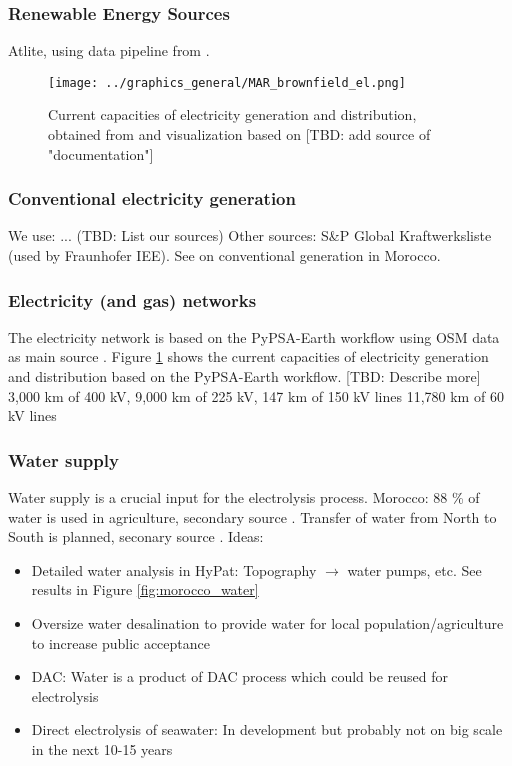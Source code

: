 \subsubsection{Renewable Energy Sources}
Atlite, using data pipeline from \cite{Parzen2022}.





\begin{figure}[h!]
    \centering
    \texttt{[image: ../graphics\_general/MAR\_brownfield\_el.png]}
    \caption{Current capacities of electricity generation and distribution, obtained from \cite{Parzen2022} and visualization based on [TBD: add source of "documentation"]}
    \label{fig:MAR_brownfield}
\end{figure}


\subsubsection{Conventional electricity generation}
We use: ... (TBD: List our sources)
Other sources: S\&P Global Kraftwerksliste (used by Fraunhofer IEE).
See \cite[p. 26]{Ersoy2022}  on conventional generation in Morocco.



\subsubsection{Electricity (and gas) networks}
The electricity network is based on the PyPSA-Earth workflow using OSM data as main source \cite{Parzen2022}. Figure \ref{fig:MAR_brownfield} shows the current capacities of electricity generation and distribution based on the PyPSA-Earth workflow. [TBD: Describe more]
3,000 km of 400 kV, 9,000 km of 225 kV, 147 km of 150 kV lines 
11,780 km of 60 kV lines \cite[p. 6, primary 44]{Boulakhbar2020}





\subsubsection{Water supply}
\label{subsec:water_supply}
Water supply is a crucial input for the electrolysis process. 
Morocco: 88 \% of water is used in agriculture, secondary source \cite{Ersoy2022}.
Transfer of water from North to South is planned, seconary source \cite{Ersoy2022}.
Ideas:
\begin{itemize}
    \item Detailed water analysis in HyPat: Topography $\rightarrow$ water pumps, etc. See results in Figure \ref{fig:morocco_water}
    \item Oversize water desalination to provide water for local population/agriculture to increase public acceptance
    \item DAC: Water is a product of DAC process which could be reused for electrolysis
    \item Direct electrolysis of seawater: In development but probably not on big scale in the next 10-15 years
\end{itemize}


